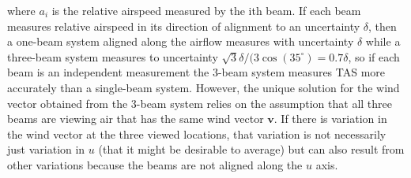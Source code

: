 \documentclass[12pt,twoside,english]{article}\usepackage[]{graphicx}\usepackage[]{color}
\begin{document}
where $a_{i}$ is the relative airspeed measured by the ith beam. %
% 
% 
% 
% 
% 
% 
% 
% 
If each beam measures relative airspeed in its direction of alignment to an uncertainty $\delta$, then a one-beam system aligned along the airflow measures with uncertainty $\delta$ while a three-beam system measures to uncertainty $\sqrt{3}\delta/(3\cos(35^{\circ})=0.7\delta$, so if each beam is an independent measurement the 3-beam system measures TAS more accurately than a single-beam system. However, the unique solution for the wind vector obtained from the 3-beam system relies on the assumption that all three beams are viewing air that has the same wind vector $\mathbf{v}$. If there is variation in the wind vector at the three viewed locations, that variation is not necessarily just variation in $u$ (that it might be desirable to average) but can also result from other variations because the beams are not aligned along the $u$ axis. 
\end{document}
